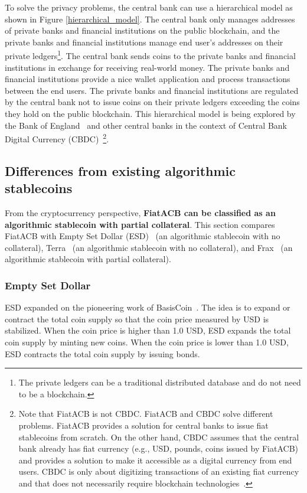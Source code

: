 \documentclass[dvipdfmx,a4paper]{article}
\begin{document}
To solve the privacy problems, the central bank can use a hierarchical model as shown in Figure \ref{hierarchical_model}. The central bank only manages addresses of private banks and financial institutions on the public blockchain, and the private banks and financial institutions manage end user's addresses on their private ledgers\footnote{The private ledgers can be a traditional distributed database and do not need to be a blockchain.}. The central bank sends coins to the private banks and financial institutions in exchange for receiving real-world money. The private banks and financial institutions provide a nice wallet application and process transactions between the end users. The private banks and financial institutions are regulated by the central bank not to issue coins on their private ledgers exceeding the coins they hold on the public blockchain. This hierarchical model is being explored by the Bank of England~\cite{cbdc1,cbdc2} and other central banks in the context of Central Bank Digital Currency (CBDC)~\cite{fung2016central}\footnote{Note that FiatACB is not CBDC. FiatACB and CBDC solve different problems. FiatACB provides a solution for central banks to issue fiat stablecoins from scratch. On the other hand, CBDC assumes that the central bank already has fiat currency (e.g., USD, pounds, coins issued by FiatACB) and provides a solution to make it accessible as a digital currency from end users. CBDC is only about digitizing transactions of an existing fiat currency and that does not necessarily require blockchain technologies~\cite{ubssurvey}.}.

\subsection{Differences from existing algorithmic stablecoins}

From the cryptocurrency perspective, \textbf{FiatACB can be classified as an algorithmic stablecoin with partial collateral}. This section compares FiatACB with Empty Set Dollar (ESD)~\cite{emptysetdollar} (an algorithmic stablecoin with no collateral), Terra~\cite{terra} (an algorithmic stablecoin with no collateral), and Frax~\cite{frax} (an algorithmic stablecoin with partial collateral).

\subsubsection{Empty Set Dollar}

ESD expanded on the pioneering work of BasisCoin~\cite{basiscoin}. The idea is to expand or contract the total coin supply so that the coin price measured by USD is stabilized. When the coin price is higher than 1.0 USD, ESD expands the total coin supply by minting new coins. When the coin price is lower than 1.0 USD, ESD contracts the total coin supply by issuing bonds.
\end{document}

